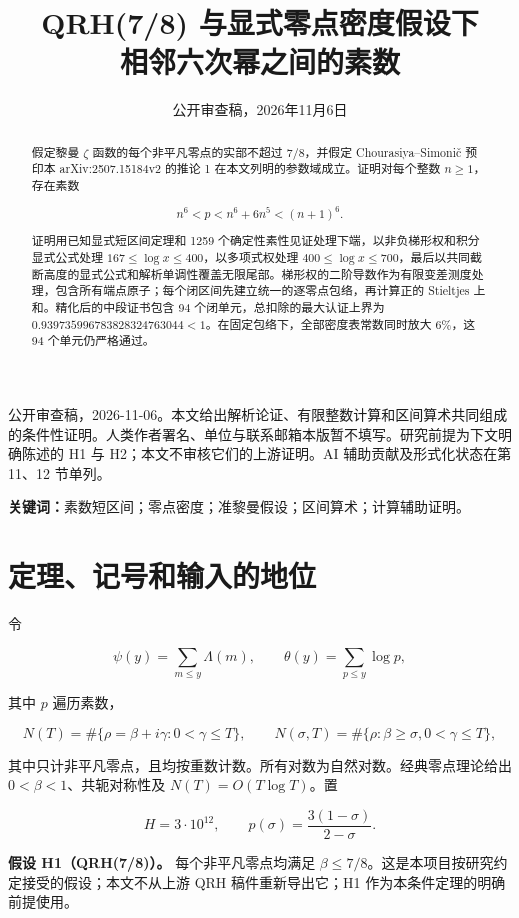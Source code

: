 \documentclass[UTF8,zihao=-4,fontset=fandol]{ctexart}
\title{QRH(7/8) 与显式零点密度假设下\\相邻六次幂之间的素数}
\author{}
\date{公开审查稿，2026年11月6日}
\begin{document}
\maketitle

公开审查稿，2026-11-06。本文给出解析论证、有限整数计算和区间算术共同组成的条件性证明。人类作者署名、单位与联系邮箱本版暂不填写。研究前提为下文明确陈述的 H1 与 H2；本文不审核它们的上游证明。AI 辅助贡献及形式化状态在第 11、12 节单列。

\begin{abstract}

假定黎曼 \(\zeta\) 函数的每个非平凡零点的实部不超过 \(7/8\)，并假定 Chourasiya–Simonič 预印本 arXiv:2507.15184v2 的推论 1 在本文列明的参数域成立。证明对每个整数 \(n\ge1\)，存在素数

\[
n^6<p<n^6+6n^5<(n+1)^6.
\]

证明用已知显式短区间定理和 1259 个确定性素性见证处理下端，以非负梯形权和积分显式公式处理 \(167\le\log x\le400\)，以多项式权处理 \(400\le\log x\le700\)，最后以共同截断高度的显式公式和解析单调性覆盖无限尾部。梯形权的二阶导数作为有限变差测度处理，包含所有端点原子；每个闭区间先建立统一的逐零点包络，再计算正的 Stieltjes 上和。精化后的中段证书包含 94 个闭单元，总扣除的最大认证上界为 \(0.939735996783828324763044<1\)。在固定包络下，全部密度表常数同时放大 \(6\%\)，这 94 个单元仍严格通过。

\end{abstract}
\noindent\textbf{关键词：}素数短区间；零点密度；准黎曼假设；区间算术；计算辅助证明。
\tableofcontents\newpage
\section{定理、记号和输入的地位}

令

\[
\psi(y)=\sum_{m\le y}\Lambda(m),\qquad
\theta(y)=\sum_{p\le y}\log p,
\]

其中 \(p\) 遍历素数，

\[
N(T)=\#\{\rho=\beta+i\gamma:0<\gamma\le T\},\qquad
N(\sigma,T)=\#\{\rho:\beta\ge\sigma, 0<\gamma\le T\},
\]

其中只计非平凡零点，且均按重数计数。所有对数为自然对数。经典零点理论给出 \(0<\beta<1\)、共轭对称性及 \(N(T)=O(T\log T)\)。置

\[
H=3\cdot10^{12},\qquad
p(\sigma)=\frac{3(1-\sigma)}{2-\sigma}.
\]

\textbf{假设 H1（QRH(7/8)）。} 每个非平凡零点均满足 \(\beta\le7/8\)。这是本项目按研究约定接受的假设；本文不从上游 QRH 稿件重新导出它；H1 作为本条件定理的明确前提使用。
\end{document}
